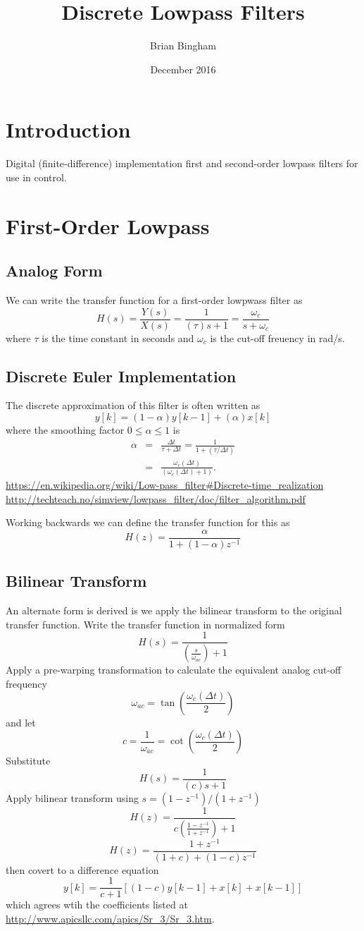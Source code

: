 \documentclass[12pt, letterpaper]{article}
\title{Discrete Lowpass Filters}
\author{Brian Bingham}%
\date{December 2016}
\begin{document}
\maketitle

\section*{Introduction}
Digital (finite-difference) implementation first and second-order lowpass filters for use in control.

\section{First-Order Lowpass}
\subsection{Analog Form}
We can write the transfer function for a first-order lowpwass filter as
\[
H(s) = \frac{Y(s)}{X(s)} = \frac{1}{(\tau)s +1} = \frac{\omega_c}{s+\omega_c}
\]
where $\tau$ is the time constant in seconds and $\omega_c$ is the cut-off freuency in rad/s.
\subsection{Discrete Euler Implementation}
The discrete approximation of this filter is often written as
\[
y[k] = (1-\alpha) y[k-1] + (\alpha) x[k]
\]
where the smoothing factor $0 \leq \alpha \leq 1$ is
\begin{eqnarray*}
\alpha & = & \frac{\Delta t}{\tau + \Delta t} = \frac{1}{1+(\tau / \Delta t)}\\
       & = & \frac{\omega_c (\Delta t)}{(\omega_c (\Delta t)+1)}.
\end{eqnarray*}
\url{https://en.wikipedia.org/wiki/Low-pass_filter#Discrete-time_realization}
\url{http://techteach.no/simview/lowpass_filter/doc/filter_algorithm.pdf}

Working backwards we can define the transfer function for this as
\[
H(z) = \frac{\alpha}{1 + (1-\alpha)z^{-1}}
\]

\subsection{Bilinear Transform}
An alternate form is derived is we apply the bilinear transform to the original transfer function.  Write the transfer function in normalized form
\[
H(s) = \frac{1}{\left(\frac{s}{\omega_{ac}}\right)+1}
\]
Apply a pre-warping transformation to calculate the equivalent analog cut-off frequency
\[
\omega_{ac} = \tan{\left(\frac{\omega_c (\Delta t)}{2}\right)}
\]
and let
\[
c = \frac{1}{\omega_{ac}}=\cot{\left(\frac{\omega_c (\Delta t)}{2}\right)}
\]
Substitute 
\[
H(s) = \frac{1}{(c)s+1}
\]
Apply bilinear transform using $s=(1-z^{-1})/(1+z^{-1})$
\[
H(z) = \frac{1}{c\left(\frac{1-z^{-1}}{1+z^{-1}}\right)+1}
\]
\[
H(z) = \frac{1 + z^{-1}}{(1+c)+(1-c)z^{-1}}
\]
then covert to a difference equation
\[
y[k] = \frac{1}{c+1} \left[ (1-c) y[k-1] + x[k] + x[k-1] \right]
\]
which agrees wtih the coefficients listed at \url{http://www.apicsllc.com/apics/Sr_3/Sr_3.htm}.
\end{document}
